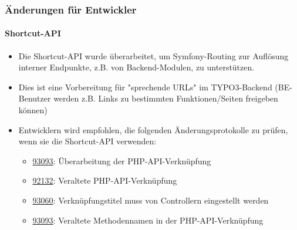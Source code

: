 %

\begin{frame}[fragile]
	\frametitle{Änderungen für Entwickler}
	\framesubtitle{Shortcut-API}

	\begin{itemize}
		\item Die Shortcut-API wurde überarbeitet, um Symfony-Routing zur Auflösung
			interner Endpunkte, z.B. von Backend-Modulen, zu unterstützen.
		\item Dies ist eine Vorbereitung für "sprechende URLs" im TYPO3-Backend\newline
			\small(BE-Benutzer werden z.B. Links zu bestimmten Funktionen/Seiten
			freigeben können)\normalsize
		\item Entwicklern wird empfohlen, die folgenden Änderungsprotokolle zu prüfen,
			wenn sie die Shortcut-API verwenden:

			\begin{itemize}
				\item \href{https://docs.typo3.org}{93093}: Überarbeitung der PHP-API-Verknüpfung
				\item \href{https://docs.typo3.org}{92132}: Veraltete PHP-API-Verknüpfung
				\item \href{https://docs.typo3.org}{93060}: Verknüpfungstitel muss von Controllern eingestellt werden
				\item \href{https://docs.typo3.org}{93093}: Veraltete Methodennamen in der PHP-API-Verknüpfung
			\end{itemize}

	\end{itemize}

\end{frame}

